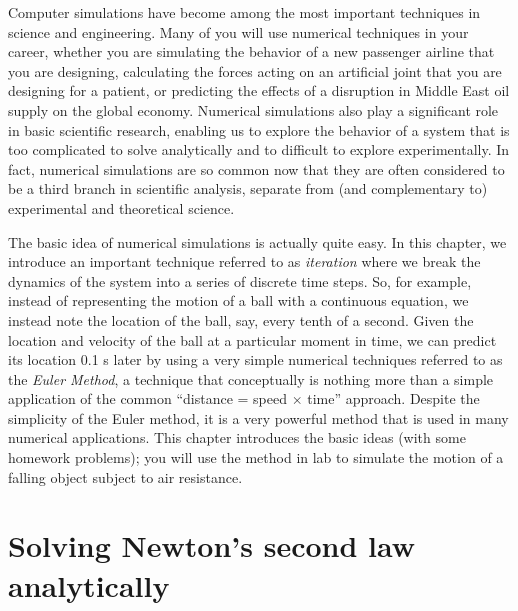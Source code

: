 Computer simulations have become among the most important techniques
in science and engineering.  Many of you will use numerical techniques
in your career, whether you are simulating the behavior of a new
passenger airline that you are designing, calculating the forces acting
on an artificial joint that you are designing for a patient, or predicting
the effects of a disruption in Middle East oil supply on the global
economy.  Numerical simulations also play a significant role in basic
scientific research, enabling us to explore the behavior of a system that
is too complicated to solve analytically and to difficult to
explore experimentally.  In fact, numerical simulations are so
common now that they are often considered to be a third branch in
scientific analysis, separate from (and complementary to) experimental
and theoretical science.

The basic idea of numerical simulations is actually quite easy.  
In this chapter, we introduce an important technique referred to as 
{\em iteration} where we break the dynamics of the system into 
a series of discrete time steps.  So, for example, instead of 
representing the motion of a ball with a continuous equation, we
instead note the location of the ball, say, every tenth of a second.
Given the location and velocity of the ball at a particular moment
in time, we can predict its location 0.1 s later by using a very 
simple numerical techniques referred to as the
{\em Euler Method}, a technique that conceptually is nothing more
than a simple application of the common ``distance = speed $\times$ time''
approach.  Despite the simplicity of the Euler method, it is a very
powerful method that is used in many numerical applications.  This chapter
introduces the basic ideas (with some homework problems); you will use
the method in lab to simulate the motion of a falling object subject
to air resistance.

\section{Solving Newton's second law analytically}

